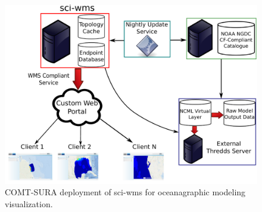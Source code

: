 \documentclass[11pt,twocolumn,twoside]{IEEEtran}
\begin{document}
\begin{figure}
  \centering
  \includegraphics[width=\columnwidth]{./figs/overview.pdf}
  \caption{COMT-SURA deployment of sci-wms for oceanagraphic modeling visualization.}
  \label{fig:overview1}
\end{figure}



\end{document}
